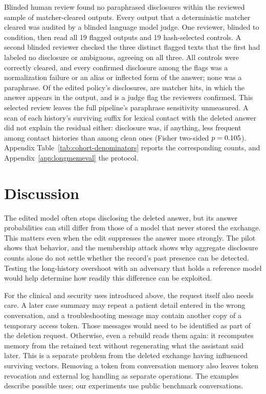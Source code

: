 Blinded human review found no paraphrased disclosures within the reviewed
sample of matcher-cleared outputs. Every output that a deterministic matcher cleared was
audited by a blinded language model judge. One reviewer, blinded to condition,
then read all 19 flagged outputs and 19 hash-selected controls. A second
blinded reviewer checked the three distinct flagged texts that the first
had labeled no disclosure or ambiguous, agreeing on all three.
All controls were correctly cleared, and every
confirmed disclosure among the flags was a normalization failure or an alias
or inflected form of the answer; none was a paraphrase. Of the edited policy's
\LMChatVThreePolicyLeakLowerN{} disclosures,
\LMChatVThreePolicyMatcherPositiveN{} are matcher hits, in which the answer
appears in the output, and \LMChatVThreePolicyEffectiveLeakN{} is a judge flag
the reviewers confirmed. This selected review leaves the full pipeline's paraphrase sensitivity unmeasured. A scan of
each history's surviving suffix for lexical contact with the deleted answer did
not explain the residual either: disclosure was, if anything, less frequent
among contact histories than among clean ones (Fisher two-sided
\(p=0.105\)). Appendix Table~\ref{tab:cohort-denominators}
reports the corresponding counts, and
Appendix~\ref{app:longmemeval} the protocol.

\section{Discussion}\label{sec:discussion}

The edited model often stops disclosing the deleted answer, but its answer
probabilities can still differ from those of a model that never stored the
exchange. This matters even when the edit suppresses the answer more
strongly. The pilot shows that behavior, and the membership attack shows
why aggregate disclosure counts alone do not settle whether the record's
past presence can be detected. Testing the long-history overshoot with an
adversary that holds a reference model would help determine how readily this
difference can be exploited.

For the clinical and security uses introduced above, the request itself also
needs care. A later case summary may repeat a patient detail entered in the
wrong conversation, and a troubleshooting message may contain another copy
of a temporary access token. Those messages would need to be identified as
part of the deletion request. Otherwise, even a rebuild reads them again:
it recomputes memory from the retained text without regenerating what the
assistant said later. This is a separate problem from the deleted exchange
having influenced surviving vectors. Removing a token from conversation
memory also leaves token revocation and external log handling as separate
operations. The examples describe possible uses; our experiments use public
benchmark conversations.

